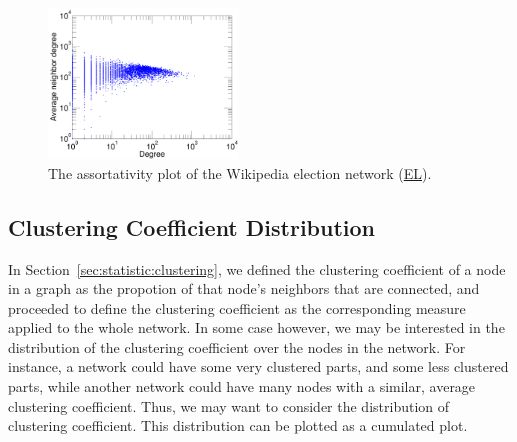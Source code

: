 \documentclass{article}
\newcommand{\wPlot}{0.45\textwidth}
\begin{document}
\begin{figure}
  \centering
  \includegraphics[width=\wPlot]{plot/assortativity.a.elec}
  \caption{
    The assortativity plot of the Wikipedia election network 
    (\href{http://konect.uni-koblenz.de/networks/elec}{\textsf{EL}}).
    \label{fig:assortativity}
  }
\end{figure}

\subsection{Clustering Coefficient Distribution}
In Section~\ref{sec:statistic:clustering}, we defined the clustering
coefficient of a node in a graph as the propotion of that node's
neighbors that are connected, and proceeded to define the clustering
coefficient as the corresponding measure applied to the whole network.
In some case however, we may be interested in the distribution of the
clustering coefficient over the nodes in the network.  For instance, a
network could have some very clustered parts, and some less clustered
parts, while another network could have many nodes with a similar,
average clustering coefficient.  Thus, we may want to consider the
distribution of clustering coefficient.  This distribution can be
plotted as a cumulated plot.
\end{document}
